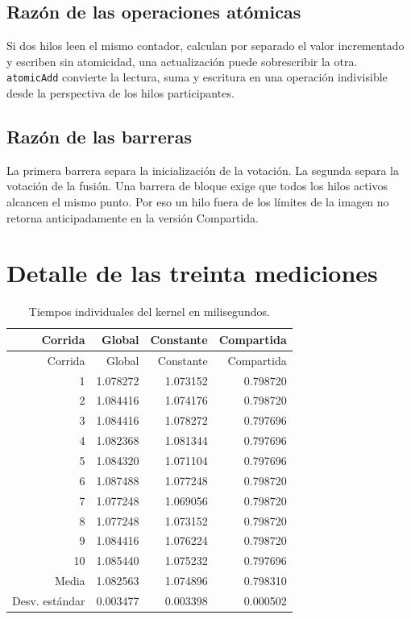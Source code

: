 \documentclass[12pt,letterpaper]{article}
\begin{document}
\subsection{Razón de las operaciones atómicas}

Si dos hilos leen el mismo contador, calculan por separado el valor incrementado y escriben sin atomicidad, una actualización puede sobrescribir la otra. \texttt{atomicAdd} convierte la lectura, suma y escritura en una operación indivisible desde la perspectiva de los hilos participantes.

\subsection{Razón de las barreras}

La primera barrera separa la inicialización de la votación. La segunda separa la votación de la fusión. Una barrera de bloque exige que todos los hilos activos alcancen el mismo punto. Por eso un hilo fuera de los límites de la imagen no retorna anticipadamente en la versión Compartida.

\section{Detalle de las treinta mediciones}

\begin{longtable}{rrrr}
  \caption{Tiempos individuales del kernel en milisegundos.}\\
  \toprule
  Corrida & Global & Constante & Compartida \\
  \midrule
  \endfirsthead
  \toprule
  Corrida & Global & Constante & Compartida \\
  \midrule
  \endhead
  1 & 1.078272 & 1.073152 & 0.798720 \\
  2 & 1.084416 & 1.074176 & 0.798720 \\
  3 & 1.084416 & 1.078272 & 0.797696 \\
  4 & 1.082368 & 1.081344 & 0.797696 \\
  5 & 1.084320 & 1.071104 & 0.797696 \\
  6 & 1.087488 & 1.077248 & 0.798720 \\
  7 & 1.077248 & 1.069056 & 0.798720 \\
  8 & 1.077248 & 1.073152 & 0.798720 \\
  9 & 1.084416 & 1.076224 & 0.798720 \\
  10 & 1.085440 & 1.075232 & 0.797696 \\
  \midrule
  Media & 1.082563 & 1.074896 & 0.798310 \\
  Desv. estándar & 0.003477 & 0.003398 & 0.000502 \\
  \bottomrule
\end{longtable}
\end{document}
